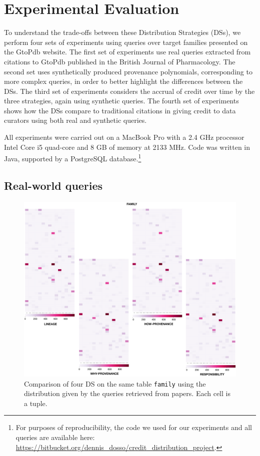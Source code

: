 \section{Experimental Evaluation}
\label{sec:experiments}
To understand the trade-offs between these Distribution Strategies (DSs), we perform four sets of experiments using queries over target families presented on the GtoPdb website. The first set of experiments use real queries extracted from citations to GtoPdb published in the British Journal of Pharmacology.  
The second set uses synthetically produced provenance polynomials, corresponding to more complex queries, in order to better highlight the differences between the DSs.
The third set of experiments considers the accrual of credit over time by the three strategies, again using synthetic queries.
The fourth set of experiments shows how the DSs compare to traditional citations in giving credit to data curators using both real and synthetic queries.

All experiments were carried out on a MacBook Pro %
with a 2.4 GHz processor Intel Core i5 quad-core and 8 GB of memory at 2133 MHz.  Code was written in Java, supported by a PostgreSQL database.\footnote{For purposes of reproducibility, the code we used for our experiments and all queries are available here: \url{https://bitbucket.org/dennis_dosso/credit_distribution_project}.}

\subsection{Real-world queries}
\label{sec:real_world_queries}

\begin{figure}[t]
\centering
  \includegraphics[width=.9\textwidth]{figures/paper_based}
  \caption{Comparison of four DS on the same table \texttt{family} using the distribution given by the queries retrieved from papers. Each cell is a tuple.}
  \label{figure:comparison_on_papers}
\end{figure}


